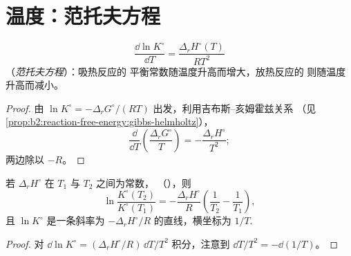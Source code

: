 \section{温度：范托夫方程}

\begin{theorem}[范托夫方程]\label{thm:b2:equilibrium-shifts:vant-hoff}
\[
  \frac{\dd\ln K^\circ}{\dd T} = \frac{\Delta_r H^\circ(T)}{RT^2}
\]
（\emph{范托夫方程}）：吸热反应的
平衡常数随温度升高而增大，放热反应的
则随温度升高而减小。
\end{theorem}

\begin{proof}
由 $\ln K^\circ = -\Delta_r G^\circ/(RT)$ 出发，利用吉布斯–亥姆霍兹关系
（见\cref{prop:b2:reaction-free-energy:gibbs-helmholtz}），
\[
  \frac{\dd}{\dd T}\left(\frac{\Delta_r G^\circ}{T}\right) =
  -\frac{\Delta_r H^\circ}{T^2} ;
\]
两边除以 $-R$。
\end{proof}

\begin{proposition}[积分形式]\label{prop:b2:equilibrium-shifts:integrated}
若 $\Delta_r H^\circ$ 在 $T_1$ 与 $T_2$ 之间为常数，
（），则
\[
  \ln\frac{K^\circ(T_2)}{K^\circ(T_1)} = -\frac{\Delta_r H^\circ}{R}\left(
  \frac{1}{T_2} - \frac{1}{T_1}\right),
\]
且 $\ln K^\circ$ 是一条斜率为 $-\Delta_r H^\circ/R$ 的直线，横坐标为
$1/T$.
\end{proposition}

\begin{proof}
对 $\dd\ln K^\circ = (\Delta_r H^\circ/R)\,\dd T/T^2$ 积分，注意到
$\dd T/T^2 = -\dd(1/T)$。
\end{proof}

